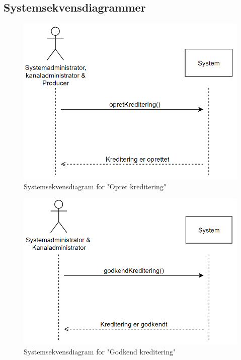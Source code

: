 \subsection{Systemsekvensdiagrammer}{\label{section: systemsekvensdiagrammer}}

\begin{figure}[H]
\centering
\includegraphics[scale=0.43]{figures/systemsekvensdiagrammer/opretKreditering.PNG}
\caption{Systemsekvensdiagram for "Opret kreditering"}
\label{fig:create_credit}
\end{figure}

\begin{figure}[H]
\centering
\includegraphics[scale=0.43]{figures/systemsekvensdiagrammer/godkendKreditering.PNG}
\caption{Systemsekvensdiagram for "Godkend kreditering"}
\label{fig:approve_credit}
\end{figure}

